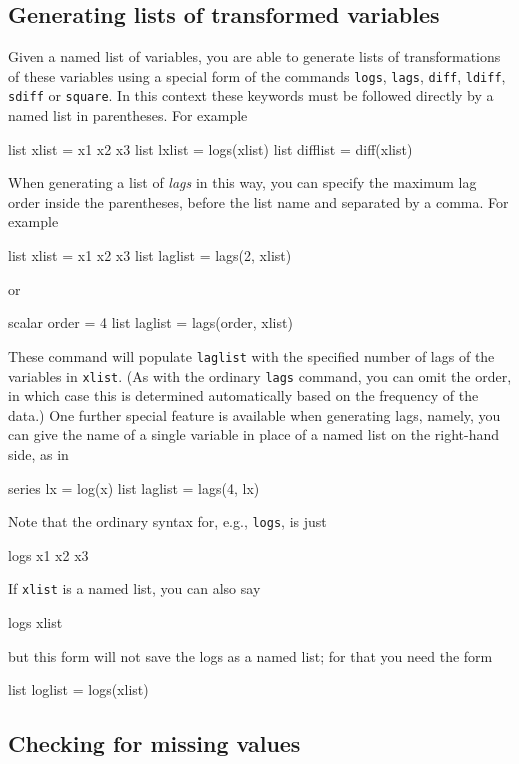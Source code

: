 \subsection{Generating lists of transformed variables}

Given a named list of variables, you are able to generate lists of
transformations of these variables using a special form of the
commands \texttt{logs}, \texttt{lags}, \texttt{diff}, \texttt{ldiff},
\texttt{sdiff} or \texttt{square}.  In this context these keywords
must be followed directly by a named list in parentheses.  For example
%
\begin{code}
list xlist = x1 x2 x3
list lxlist = logs(xlist)
list difflist = diff(xlist)
\end{code}

When generating a list of \textit{lags} in this way, you can specify
the maximum lag order inside the parentheses, before the list name and
separated by a comma.  For example
%
\begin{code}
list xlist = x1 x2 x3
list laglist = lags(2, xlist)
\end{code}
%
or
%
\begin{code}
scalar order = 4
list laglist = lags(order, xlist)
\end{code}

These command will populate \texttt{laglist} with the specified number
of lags of the variables in \texttt{xlist}.  (As with the ordinary
\texttt{lags} command, you can omit the order, in which case this is
determined automatically based on the frequency of the data.)  One
further special feature is available when generating lags, namely, you
can give the name of a single variable in place of a named list on the
right-hand side, as in
%
\begin{code}
series lx = log(x)
list laglist = lags(4, lx)
\end{code}

Note that the ordinary syntax for, e.g., \texttt{logs}, is just
%
\begin{code}
logs x1 x2 x3
\end{code}
%
If \texttt{xlist} is a named list, you can also say
%
\begin{code}
logs xlist
\end{code}
%
but this form will not save the logs as a named list; for that you
need the form
%
\begin{code}
list loglist = logs(xlist)
\end{code}


\subsection{Checking for missing values}


